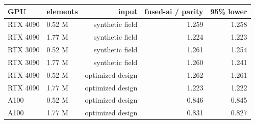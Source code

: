 \begin{tabular}{@{}llrrr@{}}
\toprule
GPU & elements & input & fused-ai / parity & 95\% lower \\
\midrule
RTX 4090 & 0.52 M & synthetic field & 1.259 & 1.258 \\
RTX 4090 & 1.77 M & synthetic field & 1.224 & 1.223 \\
RTX 3090 & 0.52 M & synthetic field & 1.261 & 1.254 \\
RTX 3090 & 1.77 M & synthetic field & 1.260 & 1.241 \\
RTX 4090 & 0.52 M & optimized design & 1.262 & 1.261 \\
RTX 4090 & 1.77 M & optimized design & 1.223 & 1.222 \\
A100 & 0.52 M & optimized design & 0.846 & 0.845 \\
A100 & 1.77 M & optimized design & 0.831 & 0.827 \\
\bottomrule
\end{tabular}
